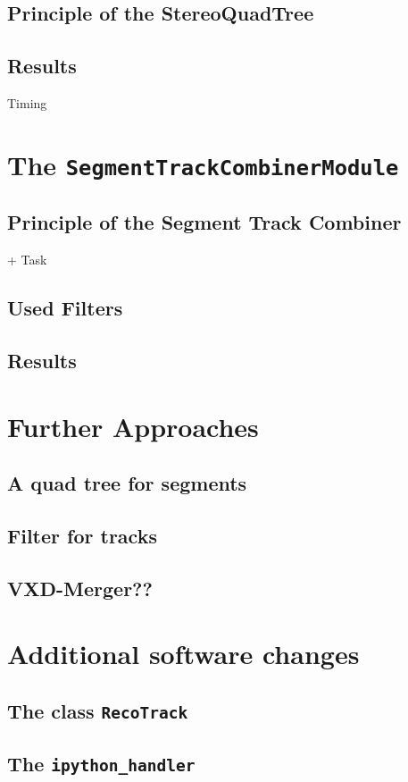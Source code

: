 \subsection{Principle of the StereoQuadTree}
\subsection{Results}
Timing

\section{The \texttt{SegmentTrackCombinerModule}}
\subsection{Principle of the Segment Track Combiner}
+ Task
\subsection{Used Filters}
\subsection{Results}

\section{Further Approaches}
\subsection{A quad tree for segments}
\subsection{Filter for tracks}
\subsection{VXD-Merger??}

\section{Additional software changes}
\subsection{The class \texttt{RecoTrack}}
\subsection{The \texttt{ipython\_handler}}